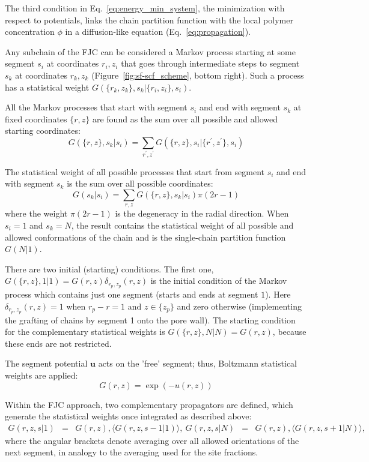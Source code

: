 \documentclass[10pt, a4paper, twocolumn]{article}
\begin{document}
The third condition in Eq.~\eqref{eq:energy_min_system}, the minimization with respect to potentials, links the chain partition function with the local polymer concentration $\phi$ in a diffusion-like equation (Eq.~\eqref{eq:propagation}).

Any subchain of the FJC can be considered a Markov process starting at some segment $s_i$ at coordinates $r_i, z_i$ that goes through intermediate steps to segment $s_k$ at coordinates $r_k, z_k$ (Figure~\ref{fig:sf-scf_scheme}, bottom right).
Such a process has a statistical weight $G(\{r_k, z_k\}, s_k | \{r_i, z_i\}, s_i)$.

All the Markov processes that start with segment $s_i$ and end with segment $s_k$ at fixed coordinates $\{r, z\}$ are found as the sum over all possible and allowed starting coordinates:
\begin{equation}
    \label{eq:sum_to_phi}
    G(\{r, z\}, s_k | s_i) = \sum_{r^{\prime}, z^{\prime}} G(\{r, z\}, s_i | \{r^{\prime}, z^{\prime}\}, s_i)
\end{equation}

The statistical weight of all possible processes that start from segment $s_i$ and end with segment $s_k$ is the sum over all possible coordinates:
\begin{equation}
    G(s_k | s_i) = \sum_{r, z} G(\{r, z\}, s_k | s_i) \pi (2r-1)
\end{equation}
where the weight $\pi (2r-1)$ is the degeneracy in the radial direction.
When $s_i=1$ and $s_k=N$, the result contains the statistical weight of all possible and allowed conformations of the chain and is the single-chain partition function $G(N|1)$.

There are two initial (starting) conditions.
The first one, $G(\{r, z\}, 1|1)=G(r,z) \delta_{r_p,z_p}(r,z) $ is the initial condition of the Markov process which contains just one segment (starts and ends at segment $1$).
Here $\delta_{r_p,z_p}(r,z)=1$ when $r_p-r=1$ and $z \in \{z_p\}$ and zero otherwise (implementing the grafting of chains by segment 1 onto the pore wall).
The starting condition for the complementary statistical weights is $G(\{r,z\},N|N)=G(r,z)$, because these ends are not restricted. 

The segment potential $\bm{u}$ acts on the 'free' segment; thus, Boltzmann statistical weights are applied:
\begin{equation}
    G(r, z) = \exp(-u(r,z))
\end{equation}

Within the FJC approach, two complementary propagators are defined, which generate the statistical weights once integrated as described above:
\begin{eqnarray}
G({r,z},s|1) &=& G(r,z),\langle G({r,z},s-1|1)\rangle, \
G({r,z},s|N) &=& G(r,z),\langle G({r,z},s+1|N)\rangle,
\end{eqnarray}
where the angular brackets denote averaging over all allowed orientations of the next segment, in analogy to the averaging used for the site fractions.
\end{document}
